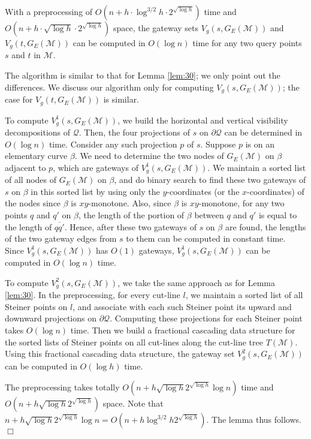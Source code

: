 \documentclass[english,runningheads,11pt]{llncs}
\def\calM{\mathcal{M}}
\def\calQ{\mathcal{Q}}
\newenvironment{proof}{\noindent {\textbf{Proof:}}\rm}{\hfill $\Box$\rm}
\begin{document}
\begin{lemma}\label{lem:70}
With a preprocessing of $O(n+h\cdot \log^{3/2} h \cdot 2^{\sqrt{\log h}})$ time and
$O(n+h\cdot \sqrt{\log h} \cdot 2^{\sqrt{\log h}})$ space,
the gateway sets $V_g(s,G_E(\calM))$
and $V_g(t,G_E(\calM))$ can be computed in
$O(\log n)$ time for any two query points $s$ and $t$ in $\calM$.
\end{lemma}
\begin{proof}
The algorithm is similar to that for Lemma \ref{lem:30}; we only point
out the differences. We discuss our algorithm only for computing
$V_g(s,G_E(\calM))$; the case for $V_g(t,G_E(\calM))$ is similar.

To compute $V^1_g(s,G_E(\calM))$, we build the horizontal and vertical
visibility decompositions of $\calQ$.
Then, the four projections of $s$ on $\partial\calQ$ can be determined
in $O(\log n)$ time. Consider
any such projection $p$ of $s$. Suppose $p$ is on an elementary curve $\beta$. We need to
determine the two nodes of $G_E(\calM)$ on $\beta$ adjacent to $p$,
which are gateways of $V^1_g(s,G_E(\calM))$.
We maintain a sorted list of all nodes of $G_E(\calM)$ on $\beta$, and
do binary search to find these two gateways of $s$ on $\beta$ in
this sorted list by using only the $y$-coordinates (or the
$x$-coordinates) of the nodes since $\beta$ is
$xy$-monotone. Also, since $\beta$ is $xy$-monotone, for any two points
$q$ and $q'$ on $\beta$, the length of the portion of $\beta$ between $q$ and
$q'$ is equal to the length of $\overline{qq'}$. Hence, after these
two gateways of $s$ on $\beta$ are found, the lengths of the two gateway
edges from $s$ to them can be
computed in constant time. Since $V^1_g(s,G_E(\calM))$ has $O(1)$
gateways, $V^1_g(s,G_E(\calM))$ can be computed in $O(\log n)$ time.

To compute $V^2_g(s,G_E(\calM))$, we take the same approach as for Lemma \ref{lem:30}.
In the preprocessing, for every cut-line $l$, we maintain a sorted list of all Steiner points
on $l$, and associate with each such Steiner point its upward and downward projections
on $\partial\calQ$.
Computing these projections for each Steiner point takes $O(\log n)$ time.
Then we build a fractional cascading data structure \cite{ref:ChazelleFr86} for
the sorted lists of Steiner points on all cut-lines along the cut-line tree
$T(\calM)$. Using this fractional cascading data structure, the gateway set
$V^2_g(s,G_E(\calM))$ can be computed in $O(\log h)$ time.

The preprocessing takes totally $O(n+h\sqrt{\log h}2^{\sqrt{\log h}}\log n)$ time and
$O(n+h\sqrt{\log h}2^{\sqrt{\log h}})$ space.
Note that
$n+h\sqrt{\log h}2^{\sqrt{\log h}}\log n=O(n+h\log^{3/2}h2^{\sqrt{\log
h}})$.
The lemma thus follows.
\end{proof}
\end{document}
